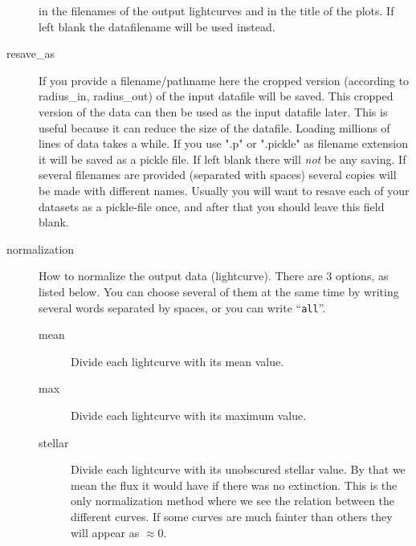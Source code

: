 \documentclass[a4paper, 12pt, english, titlepage]{article}
\begin{document}
\begin{description}
            in the filenames of the output lightcurves and in the title of the
            plots. If left blank the datafilename will be used instead.
        \item[resave\_as]
            If you provide a filename/pathname here the cropped version (according to radius\_in, radius\_out) of the input datafile will be saved. This cropped version of the data can then be used as the input datafile later. This is useful because it can reduce the size of the datafile. Loading millions of lines of data takes a while. If you use ".p" or ".pickle" as filename extension it will be saved as a pickle file. If left blank there will \emph{not} be any saving. If several filenames are provided (separated with spaces) several copies will be made with different names. Usually you will want to resave each of your datasets as a pickle-file once, and after that you should leave this field blank.
        \item[normalization]
            How to normalize the output data (lightcurve). There are 3 options, as listed below. You can choose several of them at the same time by writing several words separated by spaces, or you can write ``\texttt{all}''.
            \begin{description}
                \item[mean]
                    Divide each lightcurve with its mean value.
                \item[max]
                    Divide each lightcurve with its maximum value.
                \item[stellar]
                    Divide each lightcurve with its unobscured stellar value. By that we mean the flux it would have if there was no extinction. This is the only normalization method where we see the relation between the different curves. If some curves are much fainter than others they will appear as $\approx 0$.
            \end{description}


\end{description}
\end{document}
